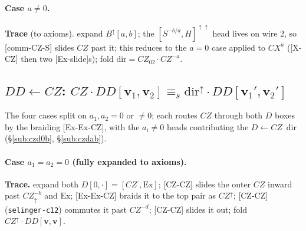 \documentclass[a4paper]{article}
\newcommand{\lem}[1]{\textsf{[#1]}}      %
\begin{document}
\paragraph{Case $a\neq0$.}
\begin{center}\end{center}
\textbf{Trace} (to axioms). expand $B^{\uparrow}[a,b]$; the $[S^{-b/a},H]^{\uparrow\uparrow}$ head lives on wire 2, so \lem{comm-CZ-S} slides $CZ$ past it; this reduces to the $a=0$ case applied to $CX^a$ (\lem{X-CZ} then two \lem{Ex-slide}s); fold $\mathrm{dir}=CZ_{02}\cdot CZ^{-a}$.

\subsection{$DD\leftarrow CZ$: \; $CZ\cdot DD[\mathbf v_1,\mathbf v_2]\equiv_s \mathrm{dir}^{\uparrow}\cdot DD[\mathbf v_1',\mathbf v_2']$}
\begin{center}\end{center}
The four cases split on $a_1,a_2=0$ or $\neq0$; each routes $CZ$ through both $D$ boxes by the braiding \lem{Ex-Ex-CZ}, with the $a_i\neq0$ heads contributing the $D\leftarrow CZ$ \,$\mathrm{dir}$ (\S\ref{sub:czd0b}, \S\ref{sub:czdab}).

\paragraph{Case $a_1=a_2=0$ \;(fully expanded to axioms).}\label{sub:czdd1}
\begin{center}\end{center}
\textbf{Trace.} expand both $D[0,\cdot]=[CZ^{\cdot},\mathrm{Ex}]$; \lem{CZ-CZ} slides the outer $CZ$ inward past $CZ^{-b}_\uparrow$ and $\mathrm{Ex}$; \lem{Ex-Ex-CZ} braids it to the top pair as $CZ^{\uparrow}$; \lem{CZ-CZ} (\texttt{selinger-c12}) commutes it past $CZ^{-d}$; \lem{CZ-CZ} slides it out; fold $CZ^{\uparrow}\cdot DD[\mathbf v,\mathbf v]$.
\end{document}
